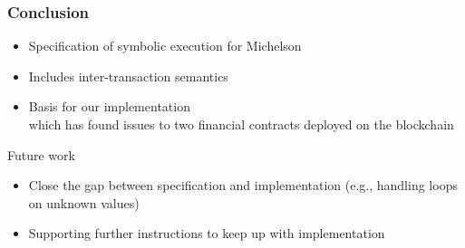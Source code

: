 \documentclass[aspectratio=1610]{beamer}
\begin{document}
\begin{frame}
  \frametitle{Conclusion}
  \begin{itemize}
  \item Specification of symbolic execution for Michelson
  \item Includes inter-transaction semantics
  \item Basis for our implementation\\
    which has found issues to two financial contracts deployed on the blockchain
  \end{itemize}
  \begin{block}{Future work}
    \begin{itemize}
    \item Close the gap between specification and implementation (e.g., handling loops on unknown values)
    \item Supporting further instructions to keep up with implementation
    \end{itemize}
  \end{block}
\end{frame}
\end{document}
